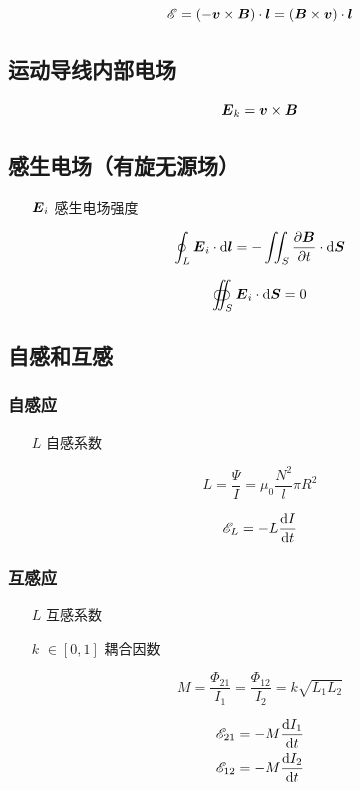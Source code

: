 \documentclass{article}
\begin{document}
\[\mathscr E=\left(-\boldsymbol{v}\times\boldsymbol{B}\right)\cdot\boldsymbol{l}=\left(\boldsymbol{B}\times\boldsymbol{v}\right)\cdot\boldsymbol{l}\]

\subsection{运动导线内部电场}

\[\boldsymbol{E}_k=\boldsymbol{v}\times\boldsymbol{B}\]

\subsection{感生电场（有旋无源场）}

\begin{enumerate}
    \item [$\boldsymbol{E}_i$] 感生电场强度
\end{enumerate}

\[\oint_L\boldsymbol{E}_i\cdot\mathrm d\boldsymbol{l}=-\iint_S\frac{\partial\boldsymbol{B}}{\partial t}\cdot\mathrm d\boldsymbol{S}\]

\[\oiint_S\boldsymbol{E}_i\cdot\mathrm d\boldsymbol{S}=0\]

\subsection{自感和互感}

\subsubsection{自感应}

\begin{enumerate}
    \item [$L$] 自感系数
\end{enumerate}

\[L=\frac{\Psi}I=\mu_0\frac{N^2}l\pi R^2\]

\[\mathscr E_L=-L\frac{\mathrm d I}{\mathrm d t}\]

\subsubsection{互感应}

\begin{enumerate}
    \item [$L$] 互感系数
    \item [$k$] $\in\left[0,1\right]$ 耦合因数
\end{enumerate}

\[M=\frac{\Phi_{21}}{I_1}=\frac{\Phi_{12}}{I_2}=k\sqrt{L_1L_2}\]

\[\begin{aligned}
        \mathscr E_{21} & =-M\frac{\mathrm d I_1}{\mathrm d t} \\
        \mathscr E_{12} & =-M\frac{\mathrm d I_2}{\mathrm d t}
    \end{aligned}\]
\end{document}
